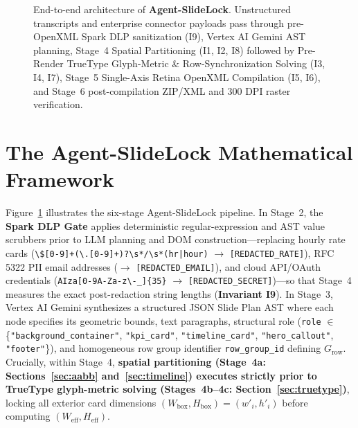 \documentclass[10pt,journal,compsoc]{IEEEtran}
\begin{document}
\begin{figure}[t]
{%
}
\caption{End-to-end architecture of \textbf{Agent-SlideLock}. Unstructured transcripts and enterprise connector payloads pass through pre-OpenXML Spark DLP sanitization (I9), Vertex AI Gemini AST planning, Stage~4 Spatial Partitioning (I1, I2, I8) followed by Pre-Render TrueType Glyph-Metric \& Row-Synchronization Solving (I3, I4, I7), Stage~5 Single-Axis Retina OpenXML Compilation (I5, I6), and Stage~6 post-compilation ZIP/XML and 300 DPI raster verification.}
\label{fig:architecture}
\end{figure}

\section{The Agent-SlideLock Mathematical Framework}
\label{sec:math}

Figure~\ref{fig:architecture} illustrates the six-stage Agent-SlideLock pipeline. In Stage~2, the \textbf{Spark DLP Gate} applies deterministic regular-expression and AST value scrubbers prior to LLM planning and DOM construction---replacing hourly rate cards (\texttt{\textbackslash\$[0-9]+(\textbackslash.[0-9]+)?\textbackslash s*/\textbackslash s*(hr|hour)} $\rightarrow$ \texttt{[REDACTED\_RATE]}), RFC 5322 PII email addresses ($\rightarrow$ \texttt{[REDACTED\_EMAIL]}), and cloud API/OAuth credentials (\texttt{AIza[0-9A-Za-z\textbackslash-\_]\{35\}} $\rightarrow$ \texttt{[REDACTED\_SECRET]})---so that Stage~4 measures the exact post-redaction string lengths (\textbf{Invariant I9}). In Stage~3, Vertex AI Gemini synthesizes a structured JSON Slide Plan AST where each node specifies its geometric bounds, text paragraphs, structural role (\texttt{role} $\in$ \{\texttt{"background\_container"}, \texttt{"kpi\_card"}, \texttt{"timeline\_card"}, \texttt{"hero\_callout"}, \texttt{"footer"}\}), and homogeneous row group identifier \texttt{row\_group\_id} defining $G_{\text{row}}$. Crucially, within Stage~4, \textbf{spatial partitioning (Stage~4a: Sections~\ref{sec:aabb} and~\ref{sec:timeline}) executes strictly prior to TrueType glyph-metric solving (Stages~4b--4c: Section~\ref{sec:truetype})}, locking all exterior card dimensions $(W_{\text{box}}, H_{\text{box}}) = (w'_i, h'_i)$ before computing $(W_{\text{eff}}, H_{\text{eff}})$.
\end{document}
